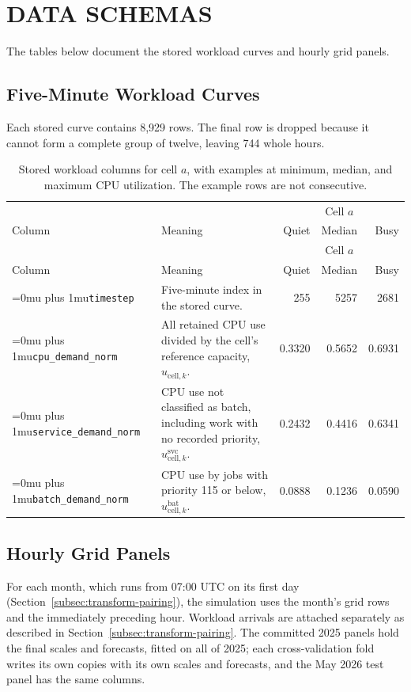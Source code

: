 \documentclass{UNCC-thesis}
\newcommand{\codepath}[1]{{\Urlmuskip=0mu plus 1mu\relax\nolinkurl{#1}}}
\begin{document}
\chapter{DATA SCHEMAS}
\label{app:data-schemas}

The tables below document the stored workload curves and hourly grid panels.

\section{Five-Minute Workload Curves}
Each stored curve contains 8,929 rows. The final row is dropped because it
cannot form a complete group of twelve, leaving 744 whole hours.

\begingroup
\small
\singlespacing
\begin{longtable}{@{}L{0.22\textwidth}L{0.39\textwidth}rrr@{}}
\caption{Stored workload columns for cell \(a\), with examples at minimum,
  median, and maximum CPU utilization. The example rows are not consecutive.}
  \label{tab:clusterdata-tier-columns}\\
    \toprule
     & &  \\
    \cmidrule(l){3-5}
    Column & Meaning & Quiet & Median & Busy \\
    \midrule
  \endfirsthead
    \toprule
     & &  \\
    \cmidrule(l){3-5}
    Column & Meaning & Quiet & Median & Busy \\
    \midrule
  \endhead
    \codepath{timestep}
      & Five-minute index in the stored curve.
      & 255 & 5257 & 2681 \\
    \addlinespace
    \codepath{cpu_demand_norm}
      & All retained CPU use divided by the cell's reference capacity,
        \(u_{\mathrm{cell},k}\).
      & 0.3320 & 0.5652 & 0.6931 \\
    \addlinespace
    \codepath{service_demand_norm}
      & CPU use not classified as batch, including work with no recorded
        priority, \(u^{\mathrm{svc}}_{\mathrm{cell},k}\).
      & 0.2432 & 0.4416 & 0.6341 \\
    \addlinespace
    \codepath{batch_demand_norm}
      & CPU use by jobs with priority 115 or below,
        \(u^{\mathrm{bat}}_{\mathrm{cell},k}\).
      & 0.0888 & 0.1236 & 0.0590 \\
    \bottomrule
\end{longtable}
\endgroup


\section{Hourly Grid Panels}
For each month, which runs from 07:00 UTC on its first day
(Section~\ref{subsec:transform-pairing}), the simulation uses the month's grid
rows and the immediately preceding hour. Workload arrivals are attached separately as
described in Section~\ref{subsec:transform-pairing}. The committed 2025
panels hold the final scales and forecasts, fitted on all of 2025; each
cross-validation fold writes its own copies with its own scales and
forecasts, and the May 2026 test panel has the same columns.
\end{document}
